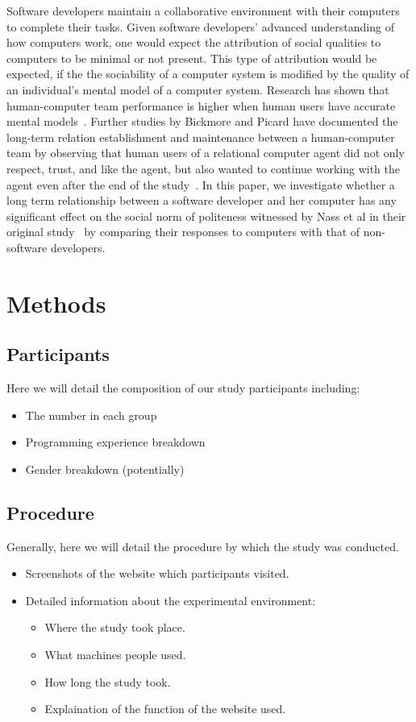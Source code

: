\documentclass{sig-alternate-05-2015}
\begin{document}
Software developers maintain a collaborative environment with their computers to complete their tasks. Given software developers' advanced understanding of how computers work, one would expect the attribution of social qualities to computers to be minimal or not present.  This type of attribution would be expected, if the the sociability of a computer system is modified by the quality of an individual's mental model of a computer system. Research has shown that human-computer team performance is higher when human users have accurate mental models~\cite{wilkison2008effects}. Further studies by Bickmore and Picard have documented the long-term relation establishment and maintenance between a human-computer team by observing that human users of a relational computer agent did not only respect, trust, and like the agent, but also wanted to continue working with the agent even after the end of the study~\cite{Bickmore:2005:EML:1067860.1067867}. In this paper, we investigate whether a long term relationship between a software developer and her computer has any significant effect on the social norm of politeness witnessed by Nass et al in their original study~\cite{nass1999people} by comparing their responses to computers with that of non-software developers.

\section{Methods}

\subsection{Participants}
Here we will detail the composition of our study participants including:
\begin{itemize}
    \item The number in each group
    \item Programming experience breakdown
    \item Gender breakdown (potentially)
\end{itemize}

\subsection{Procedure}
Generally, here we will detail the procedure by which the study was conducted.

\begin{itemize}
    \item Screenshots of the website which participants visited.
    \item Detailed information about the experimental environment: 
    \begin{itemize}
        \item Where the study took place.
        \item What machines people used.
        \item How long the study took.
        \item Explaination of the function of the website used.
    \end{itemize}
\end{itemize}
 
\end{document}
